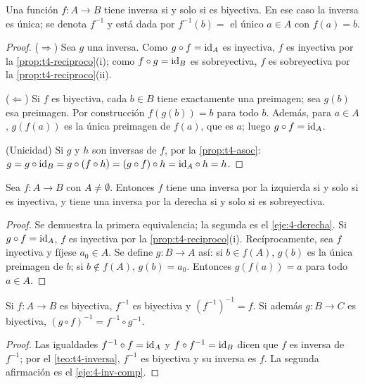 \begin{teorema}\label{teo:t4-inversa}
Una función $f\colon A\to B$ tiene inversa si y solo si es biyectiva. En ese caso la inversa es única; se denota $f^{-1}$ y está dada por $f^{-1}(b)=$ el único $a\in A$ con $f(a)=b$.
\end{teorema}

\begin{proof}
($\Rightarrow$) Sea $g$ una inversa. Como $g\circ f=\mathrm{id}_A$ es inyectiva, $f$ es inyectiva por la \cref{prop:t4-reciproco}(i); como $f\circ g=\mathrm{id}_B$ es sobreyectiva, $f$ es sobreyectiva por la \cref{prop:t4-reciproco}(ii).

($\Leftarrow$) Si $f$ es biyectiva, cada $b\in B$ tiene exactamente una preimagen; sea $g(b)$ esa preimagen. Por construcción $f(g(b))=b$ para todo $b$. Además, para $a\in A$, $g(f(a))$ es la única preimagen de $f(a)$, que es $a$; luego $g\circ f=\mathrm{id}_A$.

(Unicidad) Si $g$ y $h$ son inversas de $f$, por la \cref{prop:t4-asoc}: $g=g\circ\mathrm{id}_B=g\circ(f\circ h)=(g\circ f)\circ h=\mathrm{id}_A\circ h=h$.
\end{proof}

\begin{proposicion}\label{prop:t4-laterales}
Sea $f\colon A\to B$ con $A\neq\emptyset$. Entonces $f$ tiene una inversa por la izquierda si y solo si es inyectiva, y tiene una inversa por la derecha si y solo si es sobreyectiva.
\end{proposicion}

\begin{proof}
Se demuestra la primera equivalencia; la segunda es el \cref{eje:4-derecha}. Si $g\circ f=\mathrm{id}_A$, $f$ es inyectiva por la \cref{prop:t4-reciproco}(i). Recíprocamente, sea $f$ inyectiva y fíjese $a_0\in A$. Se define $g\colon B\to A$ así: si $b\in f(A)$, $g(b)$ es la única preimagen de $b$; si $b\notin f(A)$, $g(b)=a_0$. Entonces $g(f(a))=a$ para todo $a\in A$.
\end{proof}

\begin{proposicion}\label{prop:t4-inv-comp}
Si $f\colon A\to B$ es biyectiva, $f^{-1}$ es biyectiva y $(f^{-1})^{-1}=f$. Si además $g\colon B\to C$ es biyectiva, $(g\circ f)^{-1}=f^{-1}\circ g^{-1}$.
\end{proposicion}

\begin{proof}
Las igualdades $f^{-1}\circ f=\mathrm{id}_A$ y $f\circ f^{-1}=\mathrm{id}_B$ dicen que $f$ es inversa de $f^{-1}$; por el \cref{teo:t4-inversa}, $f^{-1}$ es biyectiva y su inversa es $f$. La segunda afirmación es el \cref{eje:4-inv-comp}.
\end{proof}

